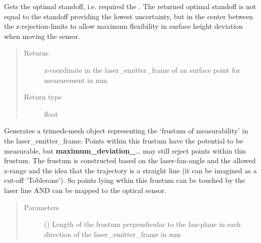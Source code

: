 \documentclass[letterpaper,10pt,english]{sphinxmanual}
\begin{document}
\begin{fulllineitems}
\begin{fulllineitems}
\end{fulllineitems}


\begin{fulllineitems}
\label{\detokenize{module_sensor_model:agiprobot_measurement.sensor_model.SensorModel.get_optimal_standoff}}
Gets the optimal standoff, i.e. required the .
The returned optimal standoff is not equal to the standoff providing the lowest uncertainty, but in the center between the z-rejection-limits
to allow maximum flexibility in surface height deviation when moving the sensor.
\begin{quote}\begin{description}
\item[{Returns}] \leavevmode
z-coordinate in the laser\_emitter\_frame of an surface point for measurement in mm

\item[{Return type}] \leavevmode
float

\end{description}\end{quote}

\end{fulllineitems}


\begin{fulllineitems}
\label{\detokenize{module_sensor_model:agiprobot_measurement.sensor_model.SensorModel.get_scanning_frustum}}
Generates a trimesh-mesh object representing the ‘frustum of measurability’ in the laser\_emitter\_frame. Points within this frustum have 
the potential to be measurable, but {\color{red}\bfseries{}maximum\_deviation\_}… may still reject points within this frustum. The frustum is constructed based on
the laser-fan-angle and the allowed z-range and the idea that the trajectory is a straight line (it can be imagined as a cut-off ‘Toblerone’). 
So points lying wthin this frustum can be touched by the laser line AND can be mapped to the optical sensor.
\begin{quote}\begin{description}
\item[{Parameters}] \leavevmode
{} () \textendash{} Length of the frustum perpendicular to the fan-plane in each direction of the laser\_emitter\_frame in mm


\end{description}
\end{quote}
\end{fulllineitems}
\end{fulllineitems}
\end{document}
